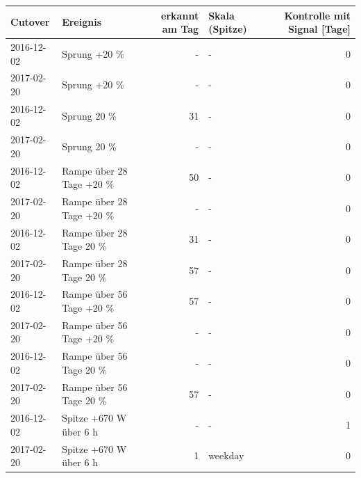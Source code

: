 \begin{tabular}{llrlr}
\toprule
Cutover & Ereignis & erkannt am Tag & Skala (Spitze) & Kontrolle mit Signal [Tage] \\
\midrule
2016-12-02 & Sprung +20 \% & - & - & 0 \\
2017-02-20 & Sprung +20 \% & - & - & 0 \\
2016-12-02 & Sprung \textminus{}20 \% & 31 & - & 0 \\
2017-02-20 & Sprung \textminus{}20 \% & - & - & 0 \\
2016-12-02 & Rampe über 28 Tage +20 \% & 50 & - & 0 \\
2017-02-20 & Rampe über 28 Tage +20 \% & - & - & 0 \\
2016-12-02 & Rampe über 28 Tage \textminus{}20 \% & 31 & - & 0 \\
2017-02-20 & Rampe über 28 Tage \textminus{}20 \% & 57 & - & 0 \\
2016-12-02 & Rampe über 56 Tage +20 \% & 57 & - & 0 \\
2017-02-20 & Rampe über 56 Tage +20 \% & - & - & 0 \\
2016-12-02 & Rampe über 56 Tage \textminus{}20 \% & - & - & 0 \\
2017-02-20 & Rampe über 56 Tage \textminus{}20 \% & 57 & - & 0 \\
2016-12-02 & Spitze +670 W über 6 h & - & - & 1 \\
2017-02-20 & Spitze +670 W über 6 h & 1 & weekday & 0 \\
\bottomrule
\end{tabular}
